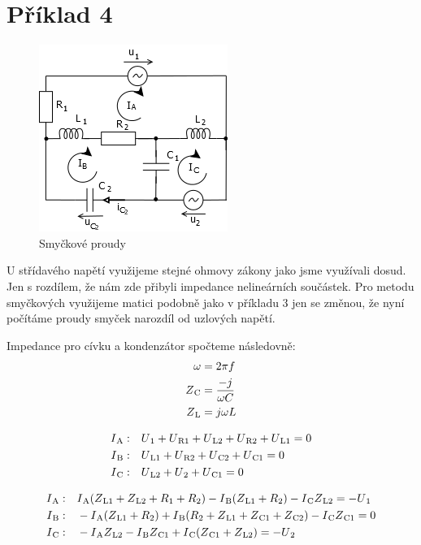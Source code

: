 \section{Příklad 4}
\begin{figure}[H]
    \centering
    \includegraphics[scale=0.8]{pic4/Pr4_2022.png}
    \caption{Smyčkové proudy}
\end{figure}
U střídavého napětí využijeme stejné ohmovy zákony jako jsme využívali dosud. Jen s rozdílem, že nám zde přibyli impedance nelineárních součástek. Pro metodu smyčkových využijeme matici podobně jako v příkladu 3 jen se změnou, že nyní počítáme proudy smyček narozdíl od uzlových napětí.

Impedance pro cívku a kondenzátor spočteme následovně:
\begin{align*}
	\omega &= 2\pi f \\
	\Z{C} &= \frac{-j}{\omega C}\\
	\Z{L} &=  j\omega L
\end{align*}

\begin{align*}
	\I{A}:\quad&\Uu{1} + \Uu{R1} + \Uu{L2} + \Uu{R2} + \Uu{L1}  = 0\\
	\I{B}:\quad&\Uu{L1} + \Uu{R2} + \Uu{C2} + \Uu{C1} = 0 \\
	\I{C}:\quad&\Uu{L2} + \Uu{2} + \Uu{C1}  = 0
\end{align*}

\begin{align*}
	\I{A}:\quad&\I{A}(\Z{L1}+\Z{L2}+\R{1}+\R{2}) - \I{B}(\Z{L1}+\R{2}) - \I{C}\Z{L2} = -\Uu{1} \\
	\I{B}:\quad&-\I{A}(\Z{L1} + \R{2}) + \I{B}(\R{2}+\Z{L1}+\Z{C1}+\Z{C2})-\I{C}\Z{C1} = 0 \\
	\I{C}:\quad&-\I{A}\Z{L2} - \I{B}\Z{C1} + \I{C}(\Z{C1}+\Z{L2}) = -\Uu{2}
\end{align*}

